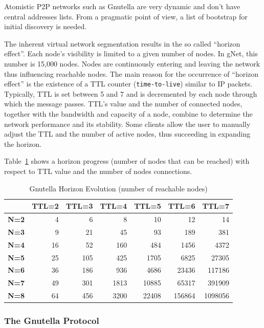 Atomistic P2P networks such as Gnutella are very dynamic and don't have central
addresses lists. From a pragmatic point of view, a list of bootstrap for initial
discovery is needed.

The inherent virtual network segmentation results in the so called ``horizon
effect''. Each node's visibility is limited to a given number of nodes. In
gNet, this number is 15,000 nodes. Nodes are continuously entering and leaving
the network thus influencing reachable nodes. The main reason for the
occurrence of ``horizon effect'' is the existence of a TTL counter
(\texttt{time-to-live}) similar to IP packets. Typically, TTL is set between 5
and 7 and is decremented by each node through which the message passes. TTL's
value and the number of connected nodes, together with the bandwidth and
capacity of a node, combine to determine the network performance and its
stability. Some clients allow the user to manually adjust the TTL and the
number of active nodes, thus succeeding in expanding the horizon.

Table~\ref{tab:p2p-systems:gnutella-horizon} shows a horizon progress
(number of nodes that can be reached) with respect to TTL value and the number
of nodes connections.

\begin{table}[htb]
  \centering
  \caption{Gnutella Horizon Evolution (number of reachable nodes)}
  \label{tab:p2p-systems:gnutella-horizon}
  \begin{tabular}{@{}lrrrrrr@{}}
    \toprule
      & \textbf{TTL=2} & \textbf{TTL=3} & \textbf{TTL=4} & \textbf{TTL=5} &
      \textbf{TTL=6} & \textbf{TTL=7} \\
    \midrule
      \textbf{N=2} & 4 & 6 & 8 & 10 & 12 & 14 \\
      \textbf{N=3} & 9 & 21 & 45 & 93 & 189 & 381 \\
      \textbf{N=4} & 16 & 52 & 160 & 484 & 1456 & 4372 \\
      \textbf{N=5} & 25 & 105 & 425 & 1705 & 6825 & 27305 \\
      \textbf{N=6} & 36 & 186 & 936 & 4686 & 23436 & 117186 \\
      \textbf{N=7} & 49 & 301 & 1813 & 10885 & 65317 & 391909 \\
      \textbf{N=8} & 64 & 456 & 3200 & 22408 & 156864 & 1098056 \\
    \bottomrule
  \end{tabular}
\end{table}

\subsubsection{The Gnutella Protocol}

